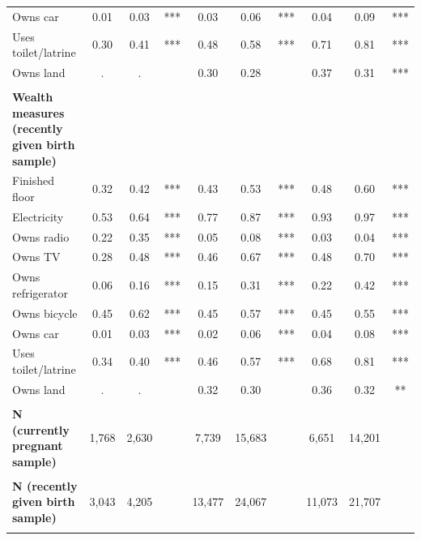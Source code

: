 \begin{tabular}{lccccccccc}
\hspace*{2em}Owns car&0.01&0.03&***&0.03&0.06&***&0.04&0.09&***\\
\hspace*{2em}Uses toilet/latrine&0.30&0.41&***&0.48&0.58&***&0.71&0.81&***\\
\hspace*{2em}Owns land&.&.&&0.30&0.28&&0.37&0.31&***\\
&&&&&&&&&\\
\textbf{Wealth measures (recently given birth sample)}&&&&&&&&&\\
\hspace*{2em}Finished floor&0.32&0.42&***&0.43&0.53&***&0.48&0.60&***\\
\hspace*{2em}Electricity&0.53&0.64&***&0.77&0.87&***&0.93&0.97&***\\
\hspace*{2em}Owns radio&0.22&0.35&***&0.05&0.08&***&0.03&0.04&***\\
\hspace*{2em}Owns TV&0.28&0.48&***&0.46&0.67&***&0.48&0.70&***\\
\hspace*{2em}Owns refrigerator&0.06&0.16&***&0.15&0.31&***&0.22&0.42&***\\
\hspace*{2em}Owns bicycle&0.45&0.62&***&0.45&0.57&***&0.45&0.55&***\\
\hspace*{2em}Owns car&0.01&0.03&***&0.02&0.06&***&0.04&0.08&***\\
\hspace*{2em}Uses toilet/latrine&0.34&0.40&***&0.46&0.57&***&0.68&0.81&***\\
\hspace*{2em}Owns land&.&.&&0.32&0.30&&0.36&0.32&**\\
&&&&&&&&&\\
\textbf{N (currently pregnant sample)}&1,768&2,630&&7,739&15,683&&6,651&14,201&\\
&&&&&&&&&\\
\textbf{N (recently given birth sample)}&3,043&4,205&&13,477&24,067&&11,073&21,707&\\
&&&&&&&&&\\
\bottomrule
\end{tabular}
